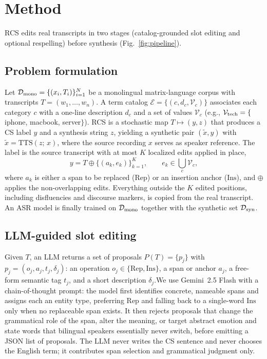 \documentclass[letterpaper]{article}
\newcommand{\method}{RCS}
\newcommand{\rep}{\ensuremath{\mathrm{Rep}}}
\newcommand{\ins}{\ensuremath{\mathrm{Ins}}}
\newcommand{\cE}{\mathcal{E}}
\newcommand{\cV}{\mathcal{V}}
\newcommand{\cD}{\mathcal{D}}
\begin{document}
\section{Method}
\label{sec:method}

\method{} edits real transcripts in two stages (catalog-grounded slot editing and optional respelling) before synthesis (Fig.~\ref{fig:pipeline}).

\subsection{Problem formulation}
Let $\cD_{\rm mono}=\{(x_i,T_i)\}_{i=1}^{N}$ be a monolingual matrix-language corpus with transcripts $T=(w_1,\ldots,w_n)$. A term catalog $\cE=\{(c,d_c,\cV_c)\}$ associates each category $c$ with a one-line description $d_c$ and a set of values $\cV_c$ (e.g., $\cV_{\rm tech}=\{$iphone, macbook, server$\}$). \method{} is a stochastic map $T\mapsto(y,z)$ that produces a CS label $y$ and a synthesis string $z$, yielding a synthetic pair $(\tilde x,y)$ with $\tilde x=\mathrm{TTS}(z;\,x)$, where the source recording $x$ serves as speaker reference. The label is the source transcript with at most $K$ localized edits applied in place,
\begin{equation}
  y = T \oplus \{(a_k,e_k)\}_{k=1}^{K}, \qquad e_k\in\textstyle\bigcup_{c}\cV_c,
  \label{eq:edit}
\end{equation}
where $a_k$ is either a span to be replaced (\rep) or an insertion anchor (\ins), and $\oplus$ applies the non-overlapping edits. Everything outside the $K$ edited positions, including disfluencies and discourse markers, is copied from the real transcript. An ASR model is finally trained on $\cD_{\rm mono}$ together with the synthetic set $\cD_{\rm syn}$.



\subsection{LLM-guided slot editing}
Given $T$, an LLM returns a set of proposals $P(T)=\{p_j\}$ with $p_j=(o_j,a_j,t_j,\delta_j)$: an operation $o_j\in\{\rep,\ins\}$, a span or anchor $a_j$, a free-form semantic tag $t_j$, and a short description $\delta_j$.We use Gemini~2.5 Flash with a chain-of-thought prompt: the model first
identifies concrete, nameable spans and assigns each an entity type, preferring \rep{} and falling back to a single-word \ins{} only when no replaceable span exists. It then rejects proposals that change the
grammatical role of the span, alter the meaning, or target abstract emotion and state words that bilingual speakers essentially never switch, before emitting a JSON list of proposals. The LLM never writes the CS sentence and never chooses the English term; it contributes span selection and grammatical judgment only.
\end{document}
